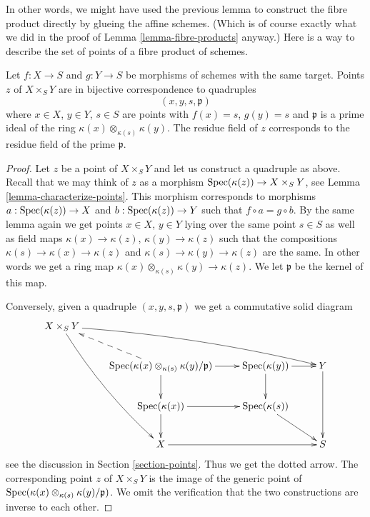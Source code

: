 \noindent
In other words, we might have used the previous lemma to construct
the fibre product directly by
glueing the affine schemes. (Which is of course exactly
what we did in the proof of Lemma \ref{lemma-fibre-products} anyway.)
Here is a way to describe the set of points of a fibre product of schemes.

\begin{lemma}
\label{lemma-points-fibre-product}
Let $f : X \to S$ and $g : Y \to S$ be morphisms of schemes
with the same target. Points $z$ of $X \times_S Y$ are in bijective
correspondence to quadruples
$$
(x, y, s, \mathfrak p)
$$
where $x \in X$, $y \in Y$, $s \in S$ are points with
$f(x) = s$, $g(y) = s$ and $\mathfrak p$ is a prime ideal
of the ring $\kappa(x) \otimes_{\kappa(s)} \kappa(y)$.
The residue field of $z$ corresponds to
the residue field of the prime $\mathfrak p$.
\end{lemma}

\begin{proof}
Let $z$ be a point of $X \times_S Y$ and let us construct a
quadruple as above. Recall that we may think of $z$ as a morphism
$\mathop{\mathrm{Spec}}(\kappa(z)) \to X \times_S Y$, see
Lemma \ref{lemma-characterize-points}. This morphism corresponds
to morphisms $a : \mathop{\mathrm{Spec}}(\kappa(z)) \to X$
and $b : \mathop{\mathrm{Spec}}(\kappa(z)) \to Y$ such that
$f \circ a = g \circ b$. By the same lemma again
we get points $x \in X$, $y \in Y$ lying over the same point
$s \in S$ as well as field maps $\kappa(x) \to \kappa(z)$,
$\kappa(y) \to \kappa(z)$ such that the compositions
$\kappa(s) \to \kappa(x) \to \kappa(z)$
and
$\kappa(s) \to \kappa(y) \to \kappa(z)$
are the same. In other words we get a ring map
$\kappa(x) \otimes_{\kappa(s)} \kappa(y) \to \kappa(z)$.
We let $\mathfrak p$ be the kernel of this map.

\medskip\noindent
Conversely, given a quadruple $(x, y, s, \mathfrak p)$ we get a
commutative solid diagram
$$
\xymatrix{
X \times_S Y
\ar@/_/[dddr] \ar@/^/[rrrd]
& & & \\
&
\Spec(\kappa(x) \otimes_{\kappa(s)} \kappa(y)/\mathfrak p)
\ar[r] \ar[d] \ar@{-->}[lu]
&
\Spec(\kappa(y)) \ar[d] \ar[r] &
Y \ar[dd] \\
&
\Spec(\kappa(x)) \ar[r] \ar[d] &
\Spec(\kappa(s)) \ar[rd] &
\\
&
X \ar[rr] &
&
S
}
$$
see the discussion in Section \ref{section-points}. Thus we get the
dotted arrow. The corresponding point $z$ of $X \times_S Y$ is the
image of the generic point of
$\mathop{\mathrm{Spec}}(\kappa(x) \otimes_{\kappa(s)} \kappa(y)/\mathfrak p)$.
We omit the verification that the two constructions are inverse
to each other.
\end{proof}

